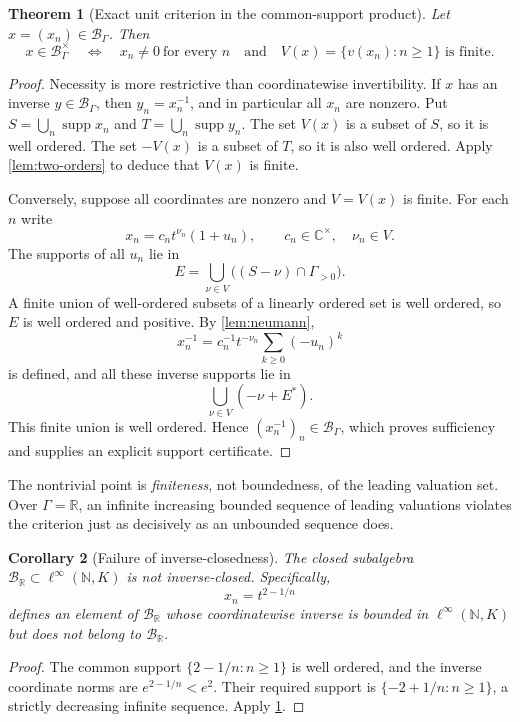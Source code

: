 \documentclass[11pt,letterpaper]{article}
\numberwithin{equation}{section}
\newtheorem{theorem}{Theorem}[section]
\newtheorem{corollary}[theorem]{Corollary}
\theoremstyle{definition}
\theoremstyle{remark}
\newcommand{\C}{\mathbb C}
\newcommand{\R}{\mathbb R}
\newcommand{\N}{\mathbb N}
\newcommand{\BB}{\mathcal B}
\newcommand{\supp}{\operatorname{supp}}
\begin{document}
\begin{theorem}[Exact unit criterion in the common-support product]
\label{thm:units}
Let $x=(x_n)\in\BB_\Gamma$. Then
\begin{equation}\label{eq:unit-criterion}
 x\in\BB_\Gamma^\times
 \quad\Longleftrightarrow\quad
 x_n\ne0\ \text{for every }n
 \quad\text{and}\quad
 V(x)=\{v(x_n):n\ge1\}\text{ is finite}.
\end{equation}
\end{theorem}
\begin{proof}
Necessity is more restrictive than coordinatewise invertibility. If $x$
has an inverse $y\in\BB_\Gamma$, then $y_n=x_n^{-1}$, and in particular
all $x_n$ are nonzero. Put $S=\bigcup_n\supp x_n$ and
$T=\bigcup_n\supp y_n$. The set $V(x)$ is a subset of $S$, so it is well
ordered. The set $-V(x)$ is a subset of $T$, so it is also well ordered.
Apply \cref{lem:two-orders} to deduce that $V(x)$ is finite.

Conversely, suppose all coordinates are nonzero and $V=V(x)$ is finite.
For each $n$ write
\[
 x_n=c_nt^{\nu_n}(1+u_n),\qquad c_n\in\C^\times,\quad \nu_n\in V.
\]
The supports of all $u_n$ lie in
\begin{equation}\label{eq:Efinite}
 E=\bigcup_{\nu\in V}\bigl((S-\nu)\cap\Gamma_{>0}\bigr).
\end{equation}
A finite union of well-ordered subsets of a linearly ordered set is well
ordered, so $E$ is well ordered and positive. By \cref{lem:neumann},
\[
 x_n^{-1}=c_n^{-1}t^{-\nu_n}\sum_{k\ge0}(-u_n)^k
\]
is defined, and all these inverse supports lie in
\begin{equation}\label{eq:inverse-support}
 \bigcup_{\nu\in V}(-\nu+E^*).
\end{equation}
This finite union is well ordered. Hence $(x_n^{-1})_n\in\BB_\Gamma$,
which proves sufficiency and supplies an explicit support certificate.
\end{proof}

The nontrivial point is \emph{finiteness}, not boundedness, of the leading
valuation set. Over $\Gamma=\R$, an infinite increasing bounded sequence
of leading valuations violates the criterion just as decisively as an
unbounded sequence does.

\begin{corollary}[Failure of inverse-closedness]\label{cor:inverseclosed}
The closed subalgebra $\BB_\R\subset\ell^\infty(\N,K)$ is not
inverse-closed. Specifically,
\[
 x_n=t^{2-1/n}
\]
defines an element of $\BB_\R$ whose coordinatewise inverse is bounded
in $\ell^\infty(\N,K)$ but does not belong to $\BB_\R$.
\end{corollary}
\begin{proof}
The common support $\{2-1/n:n\ge1\}$ is well ordered, and the inverse
coordinate norms are $e^{2-1/n}<e^2$. Their required support is
$\{-2+1/n:n\ge1\}$, a strictly decreasing infinite sequence. Apply
\cref{thm:units}.
\end{proof}
\end{document}
